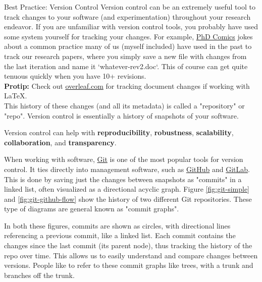 \documentclass[final]{beamer}
\newlength{\colwidth}
\begin{document}
\begin{frame}[t]
\begin{columns}[t]
\begin{column}{\colwidth}
\begin{block}{Best Practice: Version Control}
    Version control can be an extremely useful tool to track changes to your
    software (and experimentation) throughout your research endeavor.
    If you are unfamiliar with version control tools, you probably have used
    some system yourself for tracking your changes.
    For example,
    \href{https://phdcomics.com/comics/archive.php?comicid=1531}{PhD Comics}
    jokes about a common practice many of us (myself included) have used in the
    past to track our research papers, where you simply save a new file with
    changes from the last iteration and name it `whatever-rev2.doc`.
    This of course can get quite tenuous quickly when you have 10+ revisions.
    \\ \vspace{1em}
    \textbf{Protip:} Check out \href{overleaf.com}{overleaf.com} for tracking
    document changes if working with LaTeX.
    \\ \vspace{1em}
    This history of these changes (and all its metadata) is called a
    "repository" or "repo".
    Version control is essentially a history of snapshots of your software.

    Version control can help with \textbf{reproducibility},
    \textbf{robustness}, \textbf{scalability}, \textbf{collaboration}, and
    \textbf{transparency}.

    When working with software, \href{https://git-scm.com/}{Git} is one of the
    most popular tools for version control.
    It ties directly into management software, such as
    \href{https://github.com}{GitHub} and \href{https://gitlab.com}{GitLab}.
    This is done by saving just the changes between snapshots as "commits" in
    a linked list, often visualized as a directional acyclic graph.
    Figure \ref{fig:git-simple} and \ref{fig:git-github-flow} show the history
    of two different Git repositories.
    These type of diagrams are general known as "commit graphs".
    
    In both these figures, commits are shown as circles, with directional lines
    referencing a previous commit, like a linked list.
    Each commit contains the changes since the last commit (its parent node),
    thus tracking the history of the repo over time.
    This allows us to easily understand and compare changes between versions.
    People like to refer to these commit graphs like trees, with a trunk and
    branches off the trunk.


\end{block}
\end{column}
\end{columns}
\end{frame}
\end{document}
